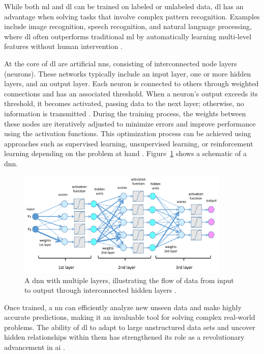 While both \gls{ml} and \gls{dl} can be trained on labeled or unlabeled data, \gls{dl} has an advantage when solving tasks that involve complex pattern recognition. Examples include image recognition, speech recognition, and natural language processing, where \gls{dl} often outperforms traditional \gls{ml} by automatically learning multi-level features without human intervention  \cite{DL_VS_ML} \cite{oD_Review}.  

At the core of \gls{dl} are artificial \gls{nn}s, consisting of interconnected node layers (neurons). These networks typically include an input layer, one or more hidden layers, and an output layer. Each neuron is connected to others through weighted connections and has an associated threshold. When a neuron's output exceeds its threshold, it becomes activated, passing data to the next layer; otherwise, no information is transmitted \cite{ibm_cnn}. During the training process, the weights between these nodes are iteratively adjusted to minimize errors and improve performance using the activation functions. This optimization process can be achieved using approaches such as supervised learning, unsupervised learning, or reinforcement learning depending on the problem at hand  \cite{DL_VS_ML} \cite{oD_Review}. Figure~\ref{DNN} shows a schematic of a \gls{dnn}. 

\begin{figure}[ht]
    \centering
    \includegraphics[width=0.9\textwidth]{Figures/deepLearn_2_EN.png} 
    \caption{A \gls{dnn} with multiple layers, illustrating the flow of data from input to output through interconnected hidden layers \cite{DNN_pic}.}
    \label{DNN}
\end{figure}

Once trained, a \gls{nn} can efficiently analyze new unseen data and make highly accurate predictions, making it an invaluable tool for solving complex real-world problems. The ability of \gls{dl} to adapt to large unstructured data sets and uncover hidden relationships within them has strengthened its role as a revolutionary advancement in \gls{ai} \cite{DL_VS_ML} \cite{oD_Review}.

